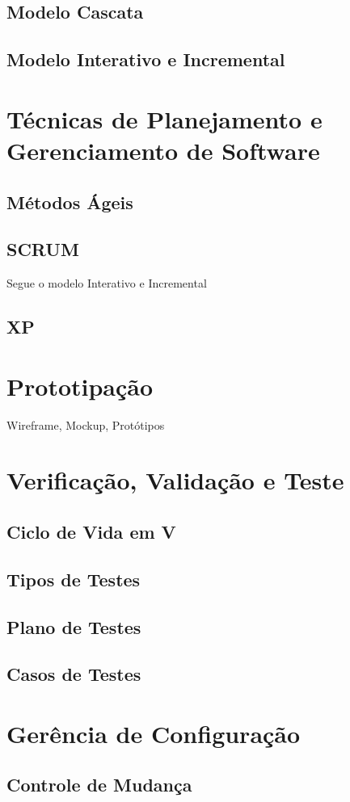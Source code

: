 \documentclass[ ]{article}
\begin{document}
		\subsection{Modelo Cascata}
		\subsection{Modelo Interativo e Incremental}
	\section{Técnicas de Planejamento e Gerenciamento de Software}
		\subsection{Métodos Ágeis}
		\subsection{SCRUM}
			Segue o modelo Interativo e Incremental
		\subsection{XP}
	\section{Prototipação}
		Wireframe, Mockup, Protótipos
	\section{Verificação, Validação e Teste}
		\subsection{Ciclo de Vida em V}
		\subsection{Tipos de Testes}
		\subsection{Plano de Testes}
		\subsection{Casos de Testes}
	\section{Gerência de Configuração}
		\subsection{Controle de Mudança}
\end{document}
